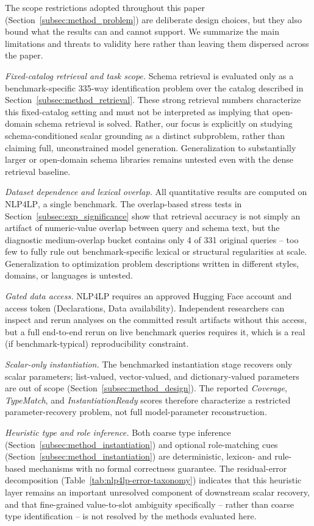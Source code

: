 \documentclass[3p]{elsarticle}
\begin{document}
The scope restrictions adopted throughout this paper (Section~\ref{subsec:method_problem}) are deliberate design choices, but they also bound what the results can and cannot support. We summarize the main limitations and threats to validity here rather than leaving them dispersed across the paper.

\emph{Fixed-catalog retrieval and task scope.} Schema retrieval is evaluated only as a benchmark-specific 335-way identification problem over the catalog described in Section~\ref{subsec:method_retrieval}. These strong retrieval numbers characterize this fixed-catalog setting and must not be interpreted as implying that open-domain schema retrieval is solved. Rather, our focus is explicitly on studying schema-conditioned scalar grounding as a distinct subproblem, rather than claiming full, unconstrained model generation. Generalization to substantially larger or open-domain schema libraries remains untested even with the dense retrieval baseline.

\emph{Dataset dependence and lexical overlap.} All quantitative results are computed on \textsc{NLP4LP}, a single benchmark. The overlap-based stress tests in Section~\ref{subsec:exp_significance} show that retrieval accuracy is not simply an artifact of numeric-value overlap between query and schema text, but the diagnostic medium-overlap bucket contains only 4 of 331 original queries -- too few to fully rule out benchmark-specific lexical or structural regularities at scale. Generalization to optimization problem descriptions written in different styles, domains, or languages is untested.

\emph{Gated data access.} \textsc{NLP4LP} requires an approved Hugging Face account and access token (Declarations, Data availability). Independent researchers can inspect and rerun analyses on the committed result artifacts without this access, but a full end-to-end rerun on live benchmark queries requires it, which is a real (if benchmark-typical) reproducibility constraint.

\emph{Scalar-only instantiation.} The benchmarked instantiation stage recovers only scalar parameters; list-valued, vector-valued, and dictionary-valued parameters are out of scope (Section~\ref{subsec:method_design}). The reported \textit{Coverage}, \textit{TypeMatch}, and \textit{InstantiationReady} scores therefore characterize a restricted parameter-recovery problem, not full model-parameter reconstruction.

\emph{Heuristic type and role inference.} Both coarse type inference (Section~\ref{subsec:method_instantiation}) and optional role-matching cues (Section~\ref{subsec:method_instantiation}) are deterministic, lexicon- and rule-based mechanisms with no formal correctness guarantee. The residual-error decomposition (Table~\ref{tab:nlp4lp-error-taxonomy}) indicates that this heuristic layer remains an important unresolved component of downstream scalar recovery, and that fine-grained value-to-slot ambiguity specifically -- rather than coarse type identification -- is not resolved by the methods evaluated here.
\end{document}
